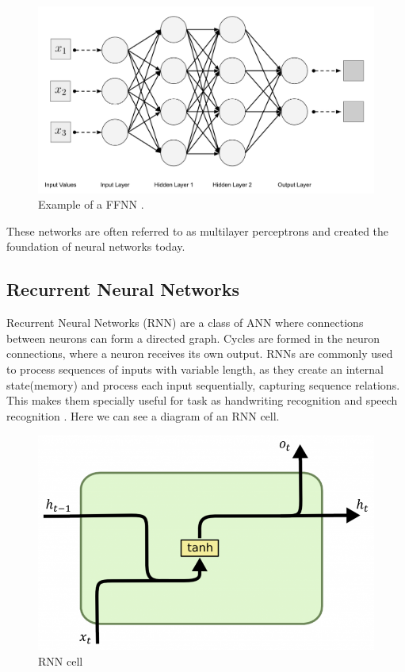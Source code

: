 \documentclass{kththesis}
\begin{document}
\begin{figure}[H]
    \centering
    \includegraphics[width=0.6\linewidth]{fnn.png}
    \caption{Example of a FFNN \cite{ffnn}.}
    \label{FFNN}
\end{figure}

These networks are often referred to as multilayer perceptrons and created the foundation of neural networks today.

\subsection{Recurrent Neural Networks}

Recurrent Neural Networks (RNN) are a class of ANN where connections between neurons can form a directed graph. Cycles are formed in the neuron connections, where a neuron receives its own output. RNNs are commonly used to process sequences of inputs with variable length, as they create an internal state(memory) and process each input sequentially, capturing sequence relations. This makes them specially useful for task as handwriting recognition \cite{rnn-hand} and speech recognition \cite{rnn-speech}. Here we can see a diagram of an RNN cell.

\begin{figure}[H]
    \centering
    \includegraphics[width=\textwidth]{images/RNN_core.png}
    \caption{RNN cell \cite{daniel}}
    \label{RNN}
\end{figure}
\end{document}

